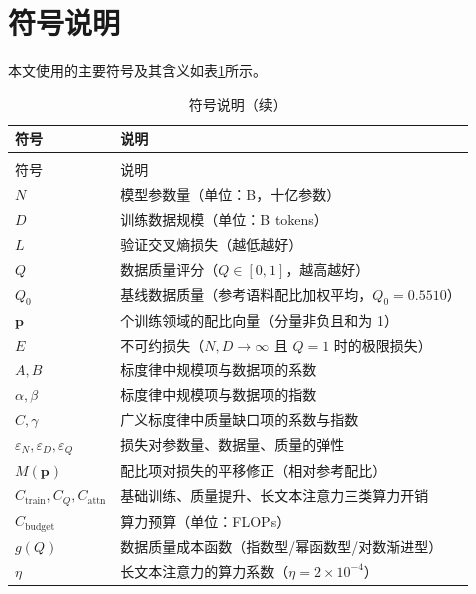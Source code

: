 \section{符号说明}

本文使用的主要符号及其含义如表\ref{tab:符号说明}所示。

\begin{longtable}{>{\centering\arraybackslash}p{}>{\centering\arraybackslash}p{}}
  \caption{符号说明}
  \label{tab:符号说明} \\
  \toprule
  符号 & 说明 \\
  \midrule
  \endfirsthead
  \caption{符号说明（续）} \\
  \toprule
  符号 & 说明 \\
  \midrule
  \endhead
  \bottomrule
  \endfoot
  $N$ & 模型参数量（单位：B，十亿参数） \\
  $D$ & 训练数据规模（单位：B tokens） \\
  $L$ & 验证交叉熵损失（越低越好） \\
  $Q$ & 数据质量评分（$Q\in[0,1]$，越高越好） \\
  $Q_0$ & 基线数据质量（参考语料配比加权平均，$Q_0=0.5510$） \\
  $\bm p$ & 17 个训练领域的配比向量（分量非负且和为 1） \\
  $E$ & 不可约损失（$N,D\to\infty$ 且 $Q=1$ 时的极限损失） \\
  $A,B$ & 标度律中规模项与数据项的系数 \\
  $\alpha,\beta$ & 标度律中规模项与数据项的指数 \\
  $C,\gamma$ & 广义标度律中质量缺口项的系数与指数 \\
  $\varepsilon_N,\varepsilon_D,\varepsilon_Q$ & 损失对参数量、数据量、质量的弹性 \\
  $M(\bm p)$ & 配比项对损失的平移修正（相对参考配比） \\
  $C_{\text{train}},C_Q,C_{\text{attn}}$ & 基础训练、质量提升、长文本注意力三类算力开销 \\
  $C_{\text{budget}}$ & 算力预算（单位：FLOPs） \\
  $g(Q)$ & 数据质量成本函数（指数型/幂函数型/对数渐进型） \\
  $\eta$ & 长文本注意力的算力系数（$\eta=2\times10^{-4}$） \\

\end{longtable}
